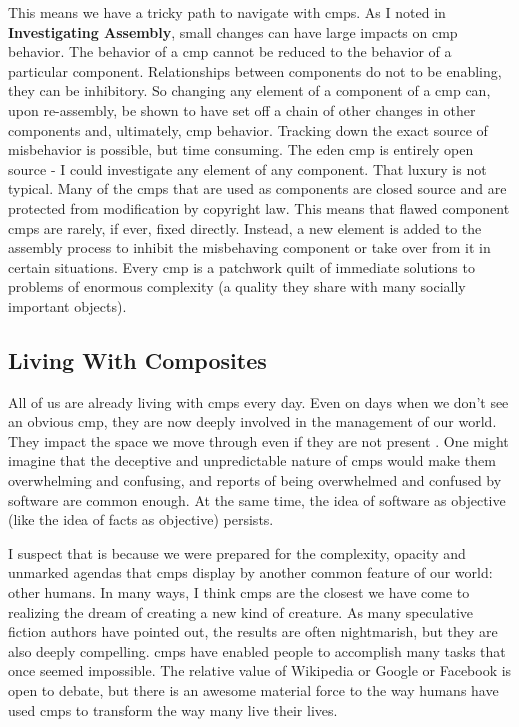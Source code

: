 \documentclass[a4paper,man,natbib,floatsintext]{apa6}
\begin{document}
  This means we have a tricky path to navigate with \glspl{cmp}. As I noted in \textbf{Investigating Assembly}, small  changes can have large impacts on \gls{cmp} behavior. The behavior of a \gls{cmp} cannot be reduced to the behavior of a particular component. Relationships between components do not to be enabling, they can be inhibitory. So changing any element of a component of a \gls{cmp} can, upon re-assembly, be shown to have set off a chain of other changes in other components and, ultimately, \gls{cmp} behavior. Tracking down the exact source of misbehavior is possible, but time consuming. The \acrshort{eden} \gls{cmp} is entirely open source - I could investigate any element of any component. That luxury is not typical. Many of the \glspl{cmp} that are used as components are closed source and are protected from modification by copyright law. This means that flawed component \glspl{cmp} are rarely, if ever, fixed directly. Instead, a new element is added to the assembly process to inhibit the misbehaving component or take over from it in certain situations. Every \gls{cmp} is a patchwork quilt of immediate solutions to problems of enormous complexity (a quality they share with many socially important objects).

  \subsection{Living With Composites}
  All of us are already living with \glspl{cmp} every day. Even on days when we don't see an obvious \gls{cmp}, they are now deeply involved in the management of our world. They impact the space we move through even if they are not present \citep{Kitchin2011-af}. One might imagine that the deceptive and unpredictable nature of \glspl{cmp} would make them overwhelming and confusing, and reports of being overwhelmed and confused by software are common enough. At the same time, the idea of software as objective (like the idea of facts as objective) persists. 

  I suspect that is because we were prepared for the complexity, opacity and unmarked agendas that \glspl{cmp} display by another common feature of our world: other humans. In many ways, I think \glspl{cmp} are the closest we have come to realizing the dream of creating a new kind of creature. As many speculative fiction authors have pointed out, the results are often nightmarish, but they are also deeply compelling. \Glspl{cmp} have enabled people to accomplish many tasks that once seemed impossible. The relative value of Wikipedia or Google or Facebook is open to debate, but there is an awesome material force to the way humans have used \glspl{cmp} to transform the way many live their lives. 
\end{document}

